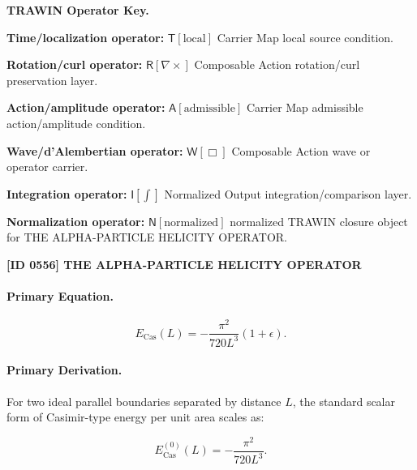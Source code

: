\par\vspace{0.45\baselineskip}
\noindent\begin{minipage}[t]{\linewidth}
\begingroup
\small
\raggedright
\textbf{TRAWIN Operator Key.}\par
\noindent\textbf{Time/localization operator:} $\mathsf{T}\!\left[\mathrm{local}\right]$ Carrier Map local source condition.\par
\noindent\textbf{Rotation/curl operator:} $\mathsf{R}\!\left[\nabla\times\right]$ Composable Action rotation/curl preservation layer.\par
\noindent\textbf{Action/amplitude operator:} $\mathsf{A}\!\left[\mathrm{admissible}\right]$ Carrier Map admissible action/amplitude condition.\par
\noindent\textbf{Wave/d'Alembertian operator:} $\mathsf{W}\!\left[\Box\right]$ Composable Action wave or operator carrier.\par
\noindent\textbf{Integration operator:} $\mathsf{I}\!\left[\int\right]$ Normalized Output integration/comparison layer.\par
\noindent\textbf{Normalization operator:} $\mathsf{N}\!\left[\mathrm{normalized}\right]$ normalized TRAWIN closure object for THE ALPHA-PARTICLE HELICITY OPERATOR.\par
\endgroup
\end{minipage}

\clearpage
\noindent\textbf{[ID 0556] THE ALPHA-PARTICLE HELICITY OPERATOR}\par
\vspace{0.35em}
\paragraph{Primary Equation.}
\begin{equation}
E_{\mathrm{Cas}}(L)
=
-\frac{\pi^2}{720L^3}(1+\epsilon).
\end{equation}

\paragraph{Primary Derivation.}
For two ideal parallel boundaries separated by distance $L$, the standard scalar form of Casimir-type energy per unit area scales as:

\begin{equation}
E_{\mathrm{Cas}}^{(0)}(L)
=
-\frac{\pi^2}{720L^3}.
\end{equation}

